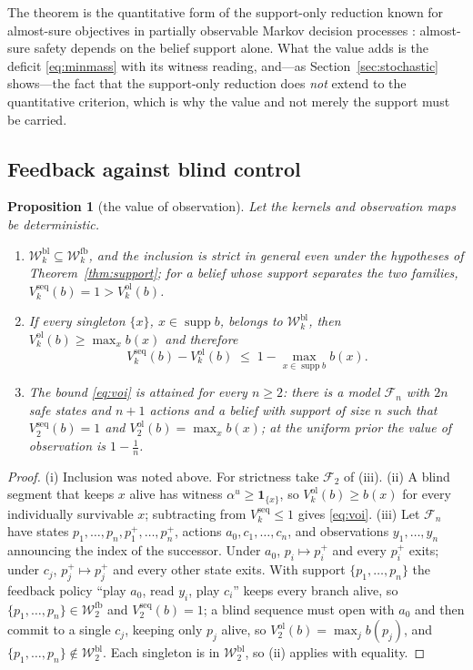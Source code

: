 \documentclass[11pt,a4paper]{article}
\theoremstyle{plain}
\newtheorem{proposition}[theorem]{Proposition}
\theoremstyle{definition}
\theoremstyle{remark}
\newcommand{\calW}{\mathcal{W}}
\newcommand{\Wfb}{\calW^{\mathrm{fb}}}
\newcommand{\Wbl}{\calW^{\mathrm{bl}}}
\newcommand{\supp}{\operatorname{supp}}
\newcommand{\ol}{\mathrm{ol}}
\newcommand{\seq}{\mathrm{seq}}
\begin{document}
The theorem is the quantitative form of the support-only reduction known for almost-sure objectives in partially observable Markov decision processes \cite{Chatterjee2010,Chatterjee2016}: almost-sure safety depends on the belief support alone. What the value adds is the deficit \eqref{eq:minmass} with its witness reading, and---as Section~\ref{sec:stochastic} shows---the fact that the support-only reduction does \emph{not} extend to the quantitative criterion, which is why the value and not merely the support must be carried.

\subsection{Feedback against blind control}

\begin{proposition}[the value of observation]\label{prop:feedback}
Let the kernels and observation maps be deterministic.
\begin{enumerate}[leftmargin=1.6em,itemsep=1pt]
\item[(i)] $\Wbl_k\subseteq\Wfb_k$, and the inclusion is strict in general even under the hypotheses of Theorem~\ref{thm:support}; for a belief whose support separates the two families, $V^{\seq}_k(b)=1>V^{\ol}_k(b)$.
\item[(ii)] If every singleton $\{x\}$, $x\in\supp b$, belongs to $\Wbl_k$, then $V^{\ol}_k(b)\ge\max_{x}b(x)$ and therefore
\begin{equation}\label{eq:voi}
V^{\seq}_k(b)-V^{\ol}_k(b)\;\le\;1-\max_{x\in\supp b}b(x).
\end{equation}
\item[(iii)] The bound \eqref{eq:voi} is attained for every $n\ge2$: there is a model $\mathcal F_n$ with $2n$ safe states and $n+1$ actions and a belief with support of size $n$ such that $V^{\seq}_2(b)=1$ and $V^{\ol}_2(b)=\max_x b(x)$; at the uniform prior the value of observation is $1-\tfrac1n$.
\end{enumerate}
\end{proposition}

\begin{proof}
(i) Inclusion was noted above. For strictness take $\mathcal F_2$ of (iii). (ii) A blind segment that keeps $x$ alive has witness $\alpha^u\ge\mathbf 1_{\{x\}}$, so $V^{\ol}_k(b)\ge b(x)$ for every individually survivable $x$; subtracting from $V^{\seq}_k\le1$ gives \eqref{eq:voi}. (iii) Let $\mathcal F_n$ have states $p_1,\dots,p_n,p_1^+,\dots,p_n^+$, actions $a_0,c_1,\dots,c_n$, and observations $y_1,\dots,y_n$ announcing the index of the successor. Under $a_0$, $p_i\mapsto p_i^+$ and every $p_i^+$ exits; under $c_j$, $p_j^+\mapsto p_j^+$ and every other state exits. With support $\{p_1,\dots,p_n\}$ the feedback policy ``play $a_0$, read $y_i$, play $c_i$'' keeps every branch alive, so $\{p_1,\dots,p_n\}\in\Wfb_2$ and $V^{\seq}_2(b)=1$; a blind sequence must open with $a_0$ and then commit to a single $c_j$, keeping only $p_j$ alive, so $V^{\ol}_2(b)=\max_j b(p_j)$, and $\{p_1,\dots,p_n\}\notin\Wbl_2$. Each singleton is in $\Wbl_2$, so (ii) applies with equality.
\end{proof}
\end{document}
